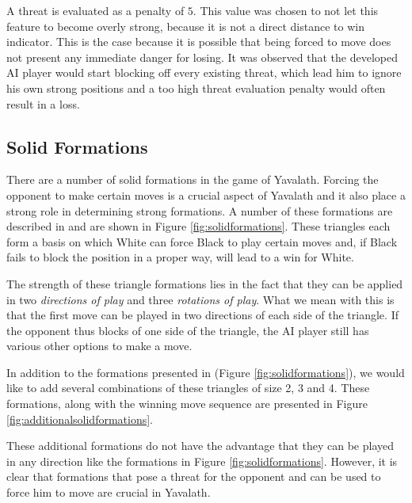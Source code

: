 \documentclass[11pt]{article}
\begin{document}


A threat is evaluated as a penalty of $5$. This value was chosen to not let this feature to become overly strong, because it is not a direct distance to win indicator. This is the case because it is possible that being forced to move does not present any immediate danger for losing. It was observed that the developed AI player would start blocking off every existing threat, which lead him to ignore his own strong positions and a too high threat evaluation penalty would often result in a loss.

\subsection{Solid Formations}
\label{-subsec:solidformations}
There are a number of solid formations in the game of Yavalath. Forcing the opponent to make certain moves is a crucial aspect of Yavalath and it also place a strong role in determining strong formations. A number of these formations are described in \cite{browne2011evolutionary} and are shown in Figure \ref{fig:solidformations}. These triangles each form a basis on which White can force Black to play certain moves and, if Black fails to block the position in a proper way, will lead to a win for White.



The strength of these triangle formations lies in the fact that they can be applied in two \emph{directions of play} and three \emph{rotations of play}. What we mean with this is that the first move can be played in two directions of each side of the triangle. If the opponent thus blocks of one side of the triangle, the AI player still has various other options to make a move.

In addition to the formations presented in \cite{browne2011evolutionary} (Figure \ref{fig:solidformations}), we would like to add several combinations of these triangles of size 2, 3 and 4. These formations, along with the winning move sequence are presented in Figure \ref{fig:additionalsolidformations}.



These additional formations do not have the advantage that they can be played in any direction like the formations in Figure \ref{fig:solidformations}. However, it is clear that formations that pose a threat for the opponent and can be used to force him to move are crucial in Yavalath.
\end{document}
